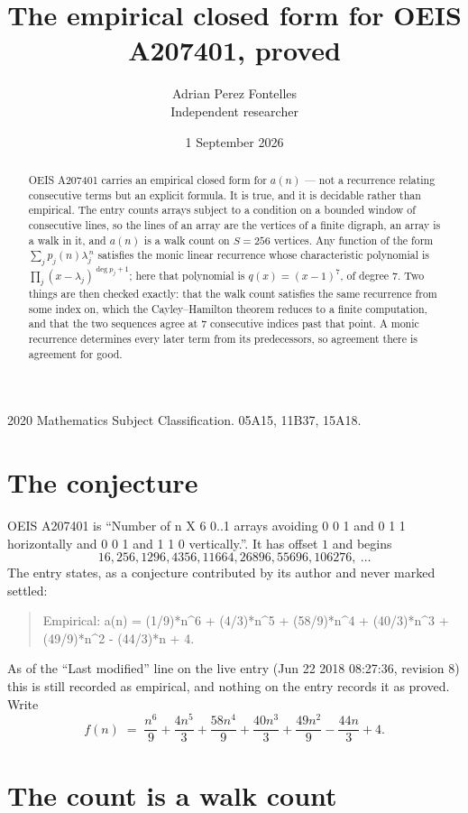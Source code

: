 \documentclass[11pt,a4paper]{article}
\title{The empirical closed form for OEIS A207401, proved}
\author{Adrian Perez Fontelles\\ \small Independent researcher}
\date{1 September 2026}
\theoremstyle{plain}
\theoremstyle{definition}
\begin{document}
\maketitle

\begin{abstract}
OEIS A207401 carries an empirical closed form for $a(n)$ --- not a recurrence relating
consecutive terms but an explicit formula. It is true, and it is decidable rather than
empirical. The entry counts arrays subject to a condition on a bounded window of consecutive lines, so the lines of an array are the
vertices of a finite digraph, an array is a walk in it, and $a(n)$ is a walk count on
$S=256$ vertices. Any function of the form $\sum_j p_j(n)\lambda_j^{\,n}$ satisfies the
monic linear recurrence whose characteristic polynomial is
$\prod_j(x-\lambda_j)^{\deg p_j+1}$; here that polynomial is $q(x)=(x-1)^{7}$, of degree
$7$. Two things are then checked exactly: that the walk count satisfies the same
recurrence from some index on, which the Cayley--Hamilton theorem reduces to a finite
computation, and that the two sequences agree at $7$ consecutive indices past that
point. A monic recurrence determines every later term from its predecessors, so agreement
there is agreement for good.
\end{abstract}

\noindent\small 2020 Mathematics Subject Classification. 05A15, 11B37, 15A18.\normalsize

\section{The conjecture}

OEIS A207401 is ``Number of n X 6 0..1 arrays avoiding 0 0 1 and 0 1 1 horizontally and 0 0 1 and 1 1 0 vertically.''. It has offset $1$ and begins
\[
16, 256, 1296, 4356, 11664, 26896, 55696, 106276,\ \dots
\]
The entry states, as a conjecture contributed by its author and never marked settled:
\begin{quote}
Empirical: a(n) = (1/9)*n\^{}6 + (4/3)*n\^{}5 + (58/9)*n\^{}4 + (40/3)*n\^{}3 + (49/9)*n\^{}2 - (44/3)*n + 4.
\end{quote}
As of the ``Last modified'' line on the live entry (Jun 22 2018 08:27:36, revision 8) this is still
recorded as empirical, and nothing on the entry records it as proved. Write
\[
f(n)\;=\;\frac{n^{6}}{9} + \frac{4 n^{5}}{3} + \frac{58 n^{4}}{9} + \frac{40 n^{3}}{3} + \frac{49 n^{2}}{9} - \frac{44 n}{3} + 4.
\]

\section{The count is a walk count}
\end{document}
